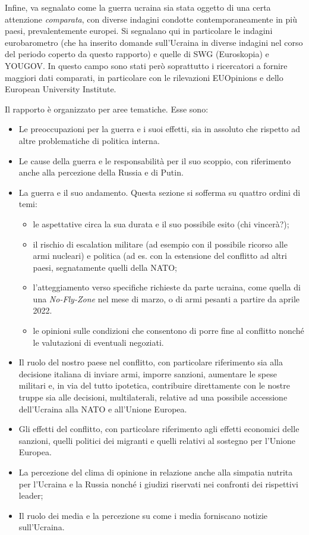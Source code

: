 \documentclass[
  openany]{book}
\providecommand{\tightlist}{%
  \setlength{\itemsep}{0pt}\setlength{\parskip}{0pt}}
\begin{document}
Infine, va segnalato come la guerra ucraina sia stata oggetto di una certa attenzione \emph{comparata}, con diverse indagini condotte contemporaneamente in più paesi, prevalentemente europei. Si segnalano qui in particolare le indagini eurobarometro (che ha inserito domande sull'Ucraina in diverse indagini nel corso del periodo coperto da questo rapporto) e quelle di SWG (Euroskopia) e YOUGOV. In questo campo sono stati però soprattutto i ricercatori a fornire maggiori dati comparati, in particolare con le rilevazioni EUOpinions e dello European University Institute.

Il rapporto è organizzato per aree tematiche. Esse sono:

\begin{itemize}
\item
  Le preoccupazioni per la guerra e i suoi effetti, sia in assoluto che rispetto ad altre problematiche di politica interna.
\item
  Le cause della guerra e le responsabilità per il suo scoppio, con riferimento anche alla percezione della Russia e di Putin.
\item
  La guerra e il suo andamento. Questa sezione si sofferma su quattro ordini di temi:

  \begin{itemize}
  \tightlist
  \item
    le aspettative circa la sua durata e il suo possibile esito (chi vincerà?);
  \item
    il rischio di escalation militare (ad esempio con il possibile ricorso alle armi nucleari) e politica (ad es. con la estensione del conflitto ad altri paesi, segnatamente quelli della NATO;
  \item
    l'atteggiamento verso specifiche richieste da parte ucraina, come quella di una \emph{No-Fly-Zone} nel mese di marzo, o di armi pesanti a partire da aprile 2022.
  \item
    le opinioni sulle condizioni che consentono di porre fine al conflitto nonché le valutazioni di eventuali negoziati.
  \end{itemize}
\item
  Il ruolo del nostro paese nel conflitto, con particolare riferimento sia alla decisione italiana di inviare armi, imporre sanzioni, aumentare le spese militari e, in via del tutto ipotetica, contribuire direttamente con le nostre truppe sia alle decisioni, multilaterali, relative ad una possibile accessione dell'Ucraina alla NATO e all'Unione Europea.
\item
  Gli effetti del conflitto, con particolare riferimento agli effetti economici delle sanzioni, quelli politici dei migranti e quelli relativi al sostegno per l'Unione Europea.
\item
  La percezione del clima di opinione in relazione anche alla simpatia nutrita per l'Ucraina e la Russia nonché i giudizi riservati nei confronti dei rispettivi leader;
\item
  Il ruolo dei media e la percezione su come i media forniscano notizie sull'Ucraina.
\end{itemize}
\end{document}
